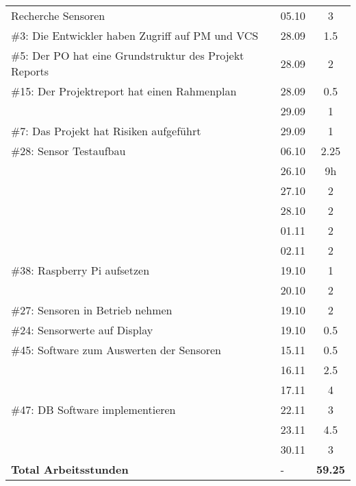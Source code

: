 \documentclass[a4paper, 10pt, fleqn]{article}
\newcommand{\footer}{\midrule\textbf{Total Arbeitsstunden}&-&\textbf{59.25}\\\midrule\bottomrule}
\begin{document}
\begin{longtable}{p{9cm}|p{2cm}|c}
            Recherche Sensoren & 05.10 & 3\\
            \#3: Die Entwickler haben Zugriff auf PM und VCS& 28.09 & 1.5\\
            \#5: Der PO hat eine Grundstruktur des Projekt Reports& 28.09 & 2\\
            \#15: Der Projektreport hat einen Rahmenplan & 28.09 & 0.5\\
            & 29.09 & 1\\
            \#7: Das Projekt hat Risiken aufgeführt & 29.09 & 1\\
            \#28: Sensor Testaufbau & 06.10 & 2.25\\
            & 26.10 & 9h \\
            & 27.10 & 2\\
            & 28.10 & 2\\
            & 01.11 & 2\\
            & 02.11 & 2\\
            \#38: Raspberry Pi aufsetzen & 19.10 & 1\\
            & 20.10 & 2\\
            \#27: Sensoren in Betrieb nehmen & 19.10 & 2\\
            \#24: Sensorwerte auf Display & 19.10 & 0.5\\
            \#45: Software zum Auswerten der Sensoren & 15.11 & 0.5\\
            & 16.11 & 2.5\\
            & 17.11 & 4\\
            \#47: DB Software implementieren & 22.11 & 3\\
            & 23.11 & 4.5\\
            & 30.11 & 3\\
            \footer
		\end{longtable}
\end{document}
